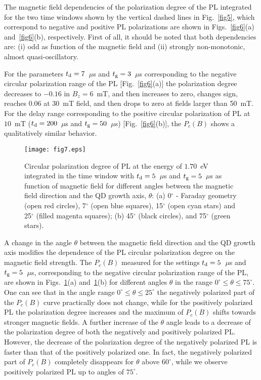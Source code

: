 \documentclass[twocolumn,showpacs,preprintnumbers,amsmath,amssymb,aps]{revtex4-1}
\begin{document}
The magnetic field dependencies of the polarization degree of the PL
integrated for the two time windows shown by the vertical dashed lines in
Fig.~\ref{fig5}, which correspond to negative and positive
PL polarizations are shown in Figs.~\ref{fig6}(a)
and~\ref{fig6}(b), respectively. First of all, it should be noted
that both dependencies are: (i) odd as function of the magnetic field and (ii) strongly
non-monotonic, almost quasi-oscillatory.

For the parameters $t_{\rm d}=7$~$\mu$s and $t_{\rm g}=3$~$\mu$s
corresponding to the negative circular polarization range of the PL
[Fig.~\ref{fig6}(a)] the polarization degree decreases to $-0.16$ in
$B_z=6$~mT, and then increases to zero, changes sign, reaches
0.06 at 30~mT field, and then drops to zero at
fields larger than 50~mT. For the delay range corresponding to the
positive circular polarization of PL at $10$~mT ($t_{\rm
d}=200$~$\mu$s and $t_{\rm g}=50$~$\mu$s) [Fig.~\ref{fig6}(b)], the
$P_c(B)$ shows a qualitatively similar behavior.

\begin{figure}[]
\centering
\texttt{[image: fig7.eps]}
\caption{Circular polarization degree of PL at the energy of
$1.70$~eV integrated in the time window with $t_{\rm d}=5$~$\mu$s
and $t_{\rm g}=5$~$\mu$s as function of magnetic field for
different angles between the magnetic field direction and the QD
growth axis, $\theta$: (a) 0$^{\circ}$ - Faraday geometry (open red
 circles), 7$^{\circ}$ (open blue squares), 15$^{\circ}$ (open cyan stars) and 25$^{\circ}$ (filled magenta squares); (b)
 45$^{\circ}$ (black circles), and 75$^{\circ}$ (green stars).} \label{fig7}
\end{figure}

A change in the angle $\theta$ between the magnetic field direction
and the QD growth axis modifies the dependence of the PL circular
polarization degree on the magnetic field strength. The $P_c(B)$
measured for the settings $t_{\rm d}=5$~$\mu$s and $t_{\rm
g}=5$~$\mu$s, corresponding to the negative circular polarization range of
the PL, are shown in Figs.~\ref{fig7}(a) and~\ref{fig7}(b) for different
angles $\theta$ in the range $0^{\circ} \leq \theta \leq
75^{\circ}$. One can see that in the angle range $0^{\circ} \leq
\theta \leq 25^{\circ}$ the negatively polarized part of the
$P_c(B)$ curve practically does not change, while for the positively
polarized PL the polarization degree increases and the maximum of
$P_c(B)$ shifts towards stronger magnetic fields. A further
increase of the $\theta$ angle leads to a decrease of the
polarization degree of both the negatively and positively polarized PL.
However, the decrease of the polarization degree of the negatively
polarized PL is faster than that of the positively polarized one.
In fact, the negatively polarized part of $P_c(B)$ completely disappears
for $\theta$ above $60^{\circ}$, while we
observe positively polarized PL up to angles of $75^{\circ}$.
\end{document}
